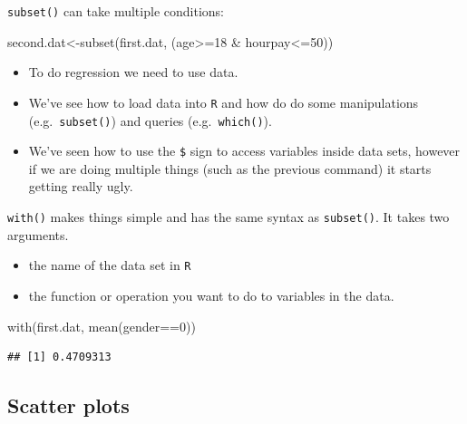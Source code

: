 \documentclass[
]{gitbook}
\newenvironment{Shaded}{\begin{snugshade}}{\end{snugshade}}
\newcommand{\DecValTok}[1]{\textcolor[rgb]{0.00,0.00,0.81}{#1}}
\newcommand{\FunctionTok}[1]{\textcolor[rgb]{0.00,0.00,0.00}{#1}}
\newcommand{\NormalTok}[1]{#1}
\newcommand{\OtherTok}[1]{\textcolor[rgb]{0.56,0.35,0.01}{#1}}
\newcommand{\SpecialCharTok}[1]{\textcolor[rgb]{0.00,0.00,0.00}{#1}}
\providecommand{\tightlist}{%
  \setlength{\itemsep}{0pt}\setlength{\parskip}{0pt}}
\begin{document}
\texttt{subset()} can take multiple conditions:

\begin{Shaded}
\begin{Highlighting}[]
\NormalTok{second.dat}\OtherTok{\textless{}{-}}\FunctionTok{subset}\NormalTok{(first.dat, (age}\SpecialCharTok{\textgreater{}=}\DecValTok{18} \SpecialCharTok{\&}\NormalTok{ hourpay}\SpecialCharTok{\textless{}=}\DecValTok{50}\NormalTok{))}
\end{Highlighting}
\end{Shaded}

\begin{itemize}
\tightlist
\item
  To do regression we need to use data.
\item
  We've see how to load data into \texttt{R} and how do do some manipulations (e.g.~\texttt{subset()}) and queries (e.g.~\texttt{which()}).
\item
  We've seen how to use the \texttt{\$} sign to access variables inside data sets, however if we are doing multiple things (such as the previous command) it starts getting really ugly.
\end{itemize}

\texttt{with()} makes things simple and has the same syntax as \texttt{subset()}. It takes two arguments.

\begin{itemize}
\tightlist
\item
  the name of the data set in \texttt{R}
\item
  the function or operation you want to do to variables in the data.
\end{itemize}

\begin{Shaded}
\begin{Highlighting}[]
\FunctionTok{with}\NormalTok{(first.dat, }\FunctionTok{mean}\NormalTok{(gender}\SpecialCharTok{==}\DecValTok{0}\NormalTok{))}
\end{Highlighting}
\end{Shaded}

\begin{verbatim}
## [1] 0.4709313
\end{verbatim}

\hypertarget{scatter-plots}{%
\subsection{Scatter plots}\label{scatter-plots}}
\end{document}
